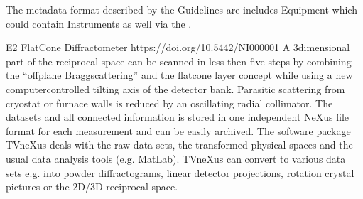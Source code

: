 \documentclass[a4paper,10pt,english]{sphinxmanual}
\begin{document}
\sphinxAtStartPar
The metadata format described by the Guidelines are includes Equipment
which could contain Instruments as well via the .
\def\sphinxLiteralBlockLabel{\label{\detokenize{white-paper/linking-datasets:id7}}\label{\detokenize{white-paper/linking-datasets:snip-link-product-oaire-cerif-xml}}}
\begin{sphinxVerbatim}[commandchars=\\\{\}]
     
         E2 \PYGZhy{} Flat\PYGZhy{}Cone Diffractometer
         https://doi.org/10.5442/NI000001
         A 3\PYGZhy{}dimensional part of the reciprocal space can be scanned in less then five steps by combining the “off\PYGZhy{}plane Bragg\PYGZhy{}scattering” and the flat\PYGZhy{}cone layer concept while using a new computer\PYGZhy{}controlled tilting axis of the detector bank. Parasitic scattering from cryostat or furnace walls is reduced by an oscillating \PYGZbs{}\PYGZdq{}radial\PYGZbs{}\PYGZdq{} collimator. The datasets and all connected information is stored in one independent NeXus file format for each measurement and can be easily archived. The software package TVneXus deals with the raw data sets, the transformed physical spaces and the usual data analysis tools (e.g. MatLab). TVneXus can convert to various data sets e.g. into powder diffractograms, linear detector projections, rotation crystal pictures or the 2D/3D reciprocal space.
\end{sphinxVerbatim}
\end{document}

